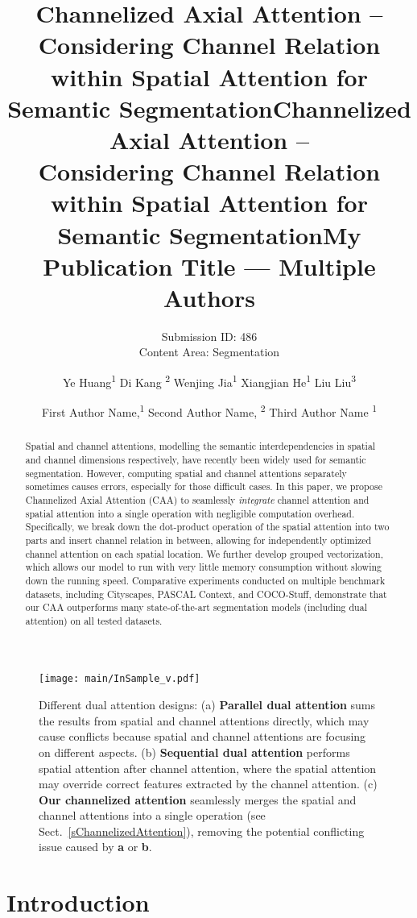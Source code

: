 \documentclass[letterpaper]{article} \usepackage{aaai22}  \usepackage{times}  \usepackage{helvet}  \usepackage{courier}  \usepackage[hyphens]{url}  \usepackage{graphicx} \urlstyle{rm} \def\UrlFont{\rm}  \usepackage{natbib}  \usepackage{caption} \DeclareCaptionStyle{ruled}{labelfont=normalfont,labelsep=colon,strut=off} \frenchspacing  \setlength{\pdfpagewidth}{8.5in}  \setlength{\pdfpageheight}{11in}  \usepackage{algorithm}
\title{Channelized Axial Attention -- \\ Considering Channel Relation within Spatial Attention for Semantic Segmentation}
\author{
    Submission ID: 486 \\
    Content Area: Segmentation
}
\title{Channelized Axial Attention -- \\ Considering Channel Relation within Spatial Attention for Semantic Segmentation}
\author {
Ye Huang\textsuperscript{\rm 1}\quad
    Di Kang \textsuperscript{\rm 2}\quad
    Wenjing Jia\textsuperscript{\rm 1}\quad
    Xiangjian He\textsuperscript{\rm 1}\quad
    Liu Liu\textsuperscript{\rm 3}\\
}
\title{My Publication Title --- Multiple Authors}
\author {
First Author Name,\textsuperscript{\rm 1}
    Second Author Name, \textsuperscript{\rm 2}
    Third Author Name \textsuperscript{\rm 1}
}
\begin{document}
\maketitle
\begin{abstract}
Spatial and channel attentions, modelling the semantic interdependencies in spatial and channel dimensions respectively, have recently been widely used for semantic segmentation.
However, computing spatial and channel attentions separately sometimes causes errors, especially for those difficult cases.
In this paper, we propose Channelized Axial Attention (CAA) to seamlessly \textit{integrate} channel attention and spatial attention into a single operation with negligible computation overhead. 
Specifically, we break down the dot-product operation of the spatial attention into two parts and insert channel relation in between, allowing for independently optimized channel attention on each spatial location.
We further develop grouped vectorization, which allows our model to run with very little memory consumption without slowing down the running speed.
Comparative experiments conducted on multiple benchmark datasets, including Cityscapes, PASCAL Context, and COCO-Stuff, demonstrate that our CAA  outperforms many state-of-the-art  segmentation  models (including dual attention) on all tested datasets.
\end{abstract}

\begin{figure}[!ht]
	\centering
	\texttt{[image: main/InSample\_v.pdf]}
	\caption{Different dual attention designs: (a) \textbf{Parallel dual attention} sums the results from spatial and channel attentions directly, which may cause conflicts because spatial and channel attentions are focusing on different aspects. (b) \textbf{Sequential dual attention} performs spatial attention after channel attention, where the spatial attention may override correct features extracted by the channel attention. (c) \textbf{Our channelized attention} seamlessly merges the spatial and channel attentions into a single operation (see Sect.~\ref{sChannelizedAttention}), removing the potential conflicting issue caused by \textbf{a} or \textbf{b}.}
	\label{fig0}
\end{figure}

\section{Introduction}
\label {sIntroduction}
\end{document}
